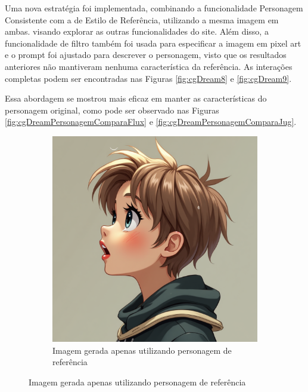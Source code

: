 Uma nova estratégia foi implementada, combinando a funcionalidade Personagem Consistente com a de Estilo de Referência, utilizando a mesma imagem em ambas. visando explorar as outras funcionalidades do site. Além disso, a funcionalidade de filtro também foi usada para especificar a imagem em pixel art e o prompt foi ajustado para descrever o personagem, visto que os resultados anteriores não mantiveram nenhuma característica da referência. As interações completas podem ser encontradas nas Figuras \ref{fig:cgDream8} e \ref{fig:cgDream9}.

Essa abordagem se mostrou mais eficaz em manter as características do personagem original, como pode ser observado nas Figuras \ref{fig:cgDreamPersonagemComparaFlux} e \ref{fig:cgDreamPersonagemComparaJug}.

\begin{figure}[htbp]
    \centering
    \caption{\small Comparativo de resultados do modelo Flux com e sem Estilo de referência}
    \label{fig:cgDreamPersonagemComparaFlux}
    \begin{subfigure}{0.45\linewidth}
        \includegraphics[width=1\linewidth]{figs/cgDream/res_char_fluxFast1.png}
        \caption{\small Imagem gerada apenas utilizando personagem de referência}
        \label{fig:CGDreamFluxSemEstilo}
    \end{subfigure}

\end{figure}
